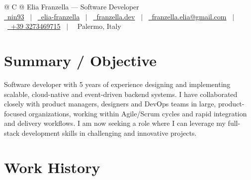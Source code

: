 \documentclass[a4paper,10pt]{article}
\begin{document}
\pagestyle{empty} 


\begin{tabularx}{\linewidth}{@{} C @{}}
    \Huge{Elia Franzella --- Software Developer} \\[7.5pt]
    \href{https://github.com/nin93}{\raisebox{-0.05\height}\faGithub\ nin93} \ $|$ \ 
    \href{https://www.linkedin.com/in/elia-franzella-20a046234/}{\raisebox{-0.05\height}\faLinkedin\ elia-franzella} \ $|$ \ 
    \href{https://www.franzella.dev}{\raisebox{-0.05\height}\faGlobe \ franzella.dev} \ $|$ \ 
    \href{mailto:franzella.elia@gmail.com}{\raisebox{-0.05\height}\faEnvelope \ franzella.elia@gmail.com} \ $|$ \ 
    \href{tel:+393273469715}{\raisebox{-0.05\height}\faMobile \ +39 3273469715}  \ $|$ \ 
    \raisebox{-0.05\height}\faMapMarker \ Palermo, Italy \\
\end{tabularx}


\section{Summary / Objective}
Software developer with 5 years of experience designing and implementing scalable, cloud-native and event-driven backend systems. I have collaborated closely with product managers, designers and DevOps teams in large, product-focused organizations, working within Agile/Scrum cycles and rapid integration and delivery workflows. I am now seeking a role where I can leverage my full-stack development skills in challenging and innovative projects.


\section{Work History}
\end{document}
